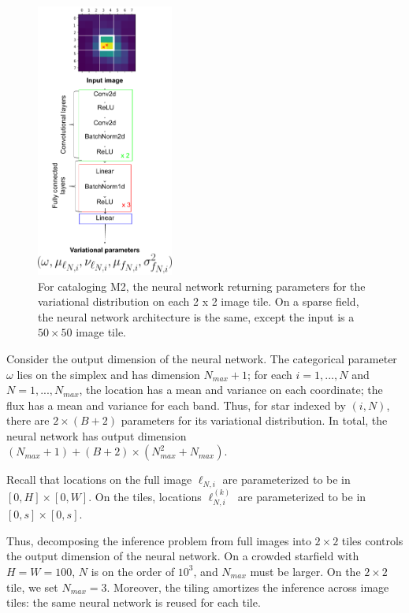 \begin{figure}[!h]
    \centering
    \includegraphics[width=0.4\textwidth]{figures/starnet_archetecture2.png}
    \vspace{-0.5cm}
    \caption{For cataloging M2, the neural network returning parameters for the variational distribution on each 2 x 2 image tile.
    On a sparse field, the neural network architecture is the same, 
    except the input is a $50 \times 50$ image tile. }
    \label{fig:starnet_arch}
\end{figure}

Consider the output dimension of the neural network. The categorical parameter $\omega$ lies on the 
simplex and has dimension $N_{max} + 1$; for each $i = 1, ..., N$ and $N = 1, ..., N_{max}$, the location has a mean and variance on each coordinate; the flux has a mean and variance for each band. Thus, for star indexed by $(i, N)$, 
there are $2 \times (B + 2)$ parameters for its variational distribution. In total, the neural network has output dimension $(N_{max} + 1) + (B + 2) \times (N_{max}^2 + N_{max})$. 

Recall that locations on the 
full image $\ell_{N, i}$ are parameterized to be in $[0, H] \times [0, W]$. 
On the tiles, locations $\ell^{(k)}_{N, i}$ are parameterized to be in
$[0, s] \times [0, s]$. 

Thus, decomposing the inference problem from full images into $2 \times 2$ tiles
controls the output dimension of the neural network. 
On a crowded starfield with $H = W = 100$, $N$ is on the order of $10^3$, 
and $N_{max}$ must be larger. 
On the $2\times 2$ tile, we set $N_{max} = 3$. 
Moreover, the tiling amortizes the inference across image tiles: the same neural network is reused for each tile. 

